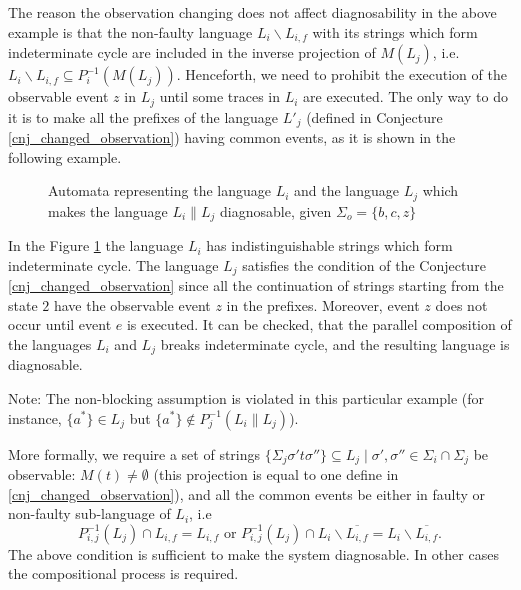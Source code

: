 \documentclass[a4paper, 10pt, conference]{ieeeconf}
\begin{document}
The reason the observation changing does not affect diagnosability in the
above example is that the non-faulty language $L_i\backslash L_{i,f}$ with its 
strings which form indeterminate cycle are included in the inverse projection of
$M(L_j)$, i.e.
$
L_i\backslash L_{i,f} \subseteq P_i^{-1}(M(L_j)).
$
Henceforth, we need to prohibit the execution of the observable event $z$
in $L_j$ until some traces in $L_i$ are executed. The only way to do it is to
make all the prefixes of the language $L'_j$ (defined in Conjecture
\ref{cnj_changed_observation}) having common events, as it is shown in the
following example.

\begin{figure}[t]
\centering

\caption{Automata representing the language $L_i$ and the language $L_j$ which
makes the language $L_i \parallel L_j$ diagnosable, given 
$\Sigma_o = \{b, c, z\}$}
\label{fig_changed_observation2}
\end{figure}

\begin{example} In the Figure \ref{fig_changed_observation2} the language $L_i$
has indistinguishable strings which form indeterminate cycle. The language
$L_j$ satisfies the condition of the Conjecture \ref{cnj_changed_observation}
since all the continuation of strings starting from the state $2$ have the
observable event $z$ in the prefixes. Moreover, event $z$ does not occur until 
event $e$ is executed. It can be checked, that the parallel composition of the
languages $L_i$ and $L_j$ breaks indeterminate cycle, and the resulting
language is diagnosable.

Note: The non-blocking assumption is violated in this particular example (for
instance, 
$\{a^*\} \in L_j$ but $\{a^*\} \not \in P^{-1}_j(L_i \parallel L_j)$).
\end{example}

More formally, we require a set of strings 
$\{\Sigma_j \sigma't\sigma''\} \subseteq L_j \mid \sigma', 
\sigma'' \in \Sigma_i \cap \Sigma_j$ be observable: $M(t) \neq \emptyset$
(this projection is equal to one define in \ref{cnj_changed_observation}),
and all the common events be either in faulty or non-faulty sub-language of
$L_i$, i.e 
$$
	P_{i,j}^{-1}(L_j) \cap L_{i,f} = L_{i,f} \textrm{ or } 
	P_{i,j}^{-1}(L_j) \cap L_i\backslash \overline{L_{i,f}} 
	= L_i\backslash \overline{L_{i,f}}.
$$
The above condition is sufficient to make the system diagnosable. In other cases
the compositional process is required.
\end{document}

